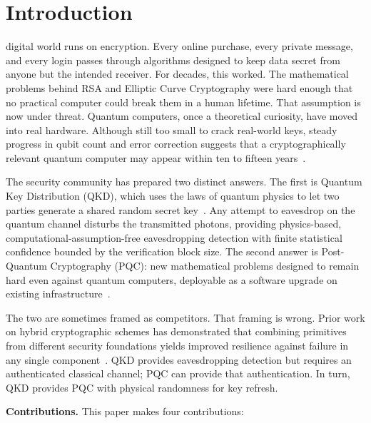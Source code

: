 \documentclass[conference]{IEEEtran}
\begin{document}
\section{Introduction}
 digital world runs on encryption. Every online purchase, every private message, and every login passes through algorithms designed to keep data secret from anyone but the intended receiver. For decades, this worked. The mathematical problems behind RSA and Elliptic Curve Cryptography were hard enough that no practical computer could break them in a human lifetime. That assumption is now under threat. Quantum computers, once a theoretical curiosity, have moved into real hardware. Although still too small to crack real-world keys, steady progress in qubit count and error correction suggests that a cryptographically relevant quantum computer may appear within ten to fifteen years~\cite{mosca2018}.

The security community has prepared two distinct answers. The first is Quantum Key Distribution (QKD), which uses the laws of quantum physics to let two parties generate a shared random secret key~\cite{bennett1984,ekert1991}. Any attempt to eavesdrop on the quantum channel disturbs the transmitted photons, providing physics-based, computational-assumption-free eavesdropping detection with finite statistical confidence bounded by the verification block size. The second answer is Post-Quantum Cryptography (PQC): new mathematical problems designed to remain hard even against quantum computers, deployable as a software upgrade on existing infrastructure~\cite{nist2022}.

The two are sometimes framed as competitors. That framing is wrong. Prior work on hybrid cryptographic schemes has demonstrated that combining primitives from different security foundations yields improved resilience against failure in any single component~\cite{bindel2019,stebila2010}. QKD provides eavesdropping detection but requires an authenticated classical channel; PQC can provide that authentication. In turn, QKD provides PQC with physical randomness for key refresh.

\textbf{Contributions.} This paper makes four contributions:
\end{document}
